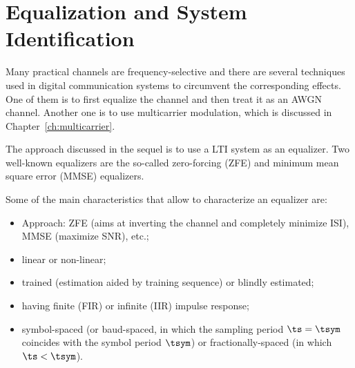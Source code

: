 


\section{Equalization and System Identification}
\label{sec:equalization}

Many practical channels are frequency-selective and there are several techniques used in digital communication systems to circumvent the corresponding effects. 
One of them is to first equalize the channel and then treat it as an AWGN channel. Another one is to use multicarrier modulation, which is discussed in Chapter~\ref{ch:multicarrier}.

The approach discussed in the sequel is to use a LTI system as an equalizer. Two well-known equalizers are the so-called zero-forcing (ZFE) and minimum mean square error (MMSE) equalizers.

Some of the main characteristics that allow to characterize an equalizer are:
\begin{itemize}
	\item Approach: ZFE (aims at inverting the channel and completely minimize ISI), MMSE (maximize SNR), etc.;
	\item linear or non-linear;
	\item trained (estimation aided by training sequence) or blindly estimated;
	\item having finite (FIR) or infinite (IIR) impulse response;
	\item symbol-spaced (or baud-spaced, in which the sampling period
	$\ts = \tsym$ coincides with the symbol period $\tsym$) or fractionally-spaced (in which 
	$\ts < \tsym$).
\end{itemize}

